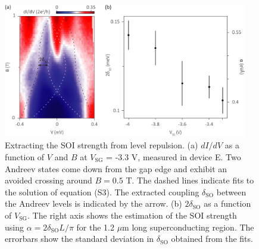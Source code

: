 \begin{figure}[h]
\includegraphics[width=0.95\textwidth]{chapter_spinorbit/figures/SFig3_Anticrossing.pdf}
\caption{\label{fig:SOIlevelrep}
Extracting the SOI strength from level repulsion.
(a) $dI/dV$ as a function of $V$ and $B$ at $V_{\mathrm{SG}}$ = -3.3 V, measured in device E.
Two Andreev states come down from the gap edge and exhibit an avoided crossing around $B = 0.5$ T.
The dashed lines indicate fits to the solution of equation (S3).
The extracted coupling $\delta_{\mathrm{SO}}$ between the Andreev levels is indicated by the arrow.
(b) $2\delta_{\mathrm{SO}}$ as a function of $V_{\mathrm{SG}}$.
The right axis shows the estimation of the SOI strength using $\alpha = 2\delta_{\mathrm{SO}}L/\pi$ for the 1.2 $\mu$m long superconducting region.
The errorbars show the standard deviation in $\delta_{\mathrm{SO}}$ obtained from the fits.
}
\end{figure}

\clearpage
